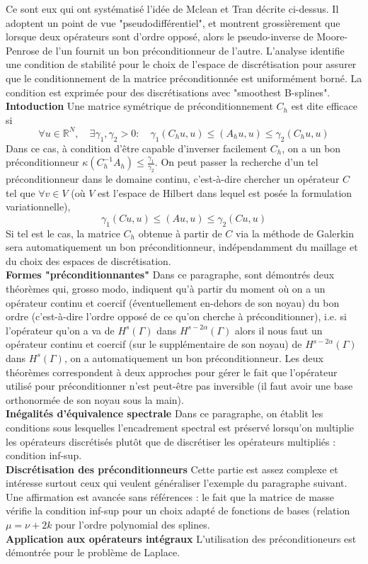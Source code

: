 \documentclass[11pt,a4paper]{article}
\begin{document}
Ce sont eux qui ont systématisé l'idée de Mclean et Tran décrite ci-dessus. Il adoptent un point de vue "pseudodifférentiel", et montrent grossièrement que lorsque deux opérateurs sont d'ordre opposé, alors le pseudo-inverse de Moore-Penrose de l'un fournit un bon préconditionneur de l'autre. L'analyse identifie une condition de stabilité pour le choix de l'espace de discrétisation pour assurer que le conditionnement de la matrice préconditionnée est uniformément borné. La condition est exprimée pour des discrétisations avec "smoothest B-splines". \\
\textbf{Intoduction} Une matrice symétrique de préconditionnement $C_h$ est dite efficace si 
\[\forall u \in \mathbb{R}^N, \quad \exists \gamma_1, \gamma_2 >0 : \quad \gamma_1 (C_h u, u) \leq (A_h u, u) \leq \gamma_2 (C_h u, u) \]
Dans ce cas, à condition d'être capable d'inverser facilement $C_h$, on a un bon préconditionneur $\kappa(C_h^{-1}A_h) \leq \frac{\gamma_1}{\gamma_2}$. On peut passer la recherche d'un tel préconditionneur dans le domaine continu, c'est-à-dire chercher un opérateur $C$ tel que $\forall v \in V$ (où $V$ est l'espace de Hilbert dans lequel est posée la formulation variationnelle), 
\[\gamma_1 (C u, u) \leq (A u, u) \leq \gamma_2 (C u, u)\]
Si tel est le cas, la matrice $C_h$ obtenue à partir de $C$ via la méthode de Galerkin sera automatiquement un bon préconditionneur, indépendamment du maillage et du choix des espaces de discrétisation. \\
\textbf{Formes "préconditionnantes"} Dans ce paragraphe, sont démontrés deux théorèmes qui, grosso modo, indiquent qu'à partir du moment où on a un opérateur continu et coercif (éventuellement en-dehors de son noyau) du bon ordre (c'est-à-dire l'ordre opposé de ce qu'on cherche à préconditionner), i.e. si l'opérateur qu'on a va de $H^{s}(\Gamma)$ dans $H^{s-2\alpha}(\Gamma)$ alors il nous faut un opérateur continu et coercif (sur le supplémentaire de son noyau) de $H^{s-2\alpha}(\Gamma)$ dans $H^{s}(\Gamma)$, on a automatiquement un bon préconditionneur. Les deux théorèmes correspondent à deux approches pour gérer le fait que l'opérateur utilisé pour préconditionner n'est peut-être pas inversible (il faut avoir une base orthonormée de son noyau sous la main).\\   
\textbf{Inégalités d'équivalence spectrale} Dans ce paragraphe, on établit les conditions sous lesquelles l'encadrement spectral est préservé lorsqu'on multiplie les opérateurs discrétisés plutôt que de discrétiser les opérateurs multipliés : condition inf-sup.\\
\textbf{Discrétisation des préconditionneurs} Cette partie est assez complexe et intéresse surtout ceux qui veulent généraliser l'exemple du paragraphe suivant. Une affirmation est avancée sans références : le fait que la matrice de masse vérifie la condition inf-sup pour un choix adapté de fonctions de bases (relation $\mu = \nu + 2k$ pour l'ordre polynomial des splines. \\
\textbf{Application aux opérateurs intégraux} L'utilisation des préconditioneurs est démontrée pour le problème de Laplace. 
\end{document}
